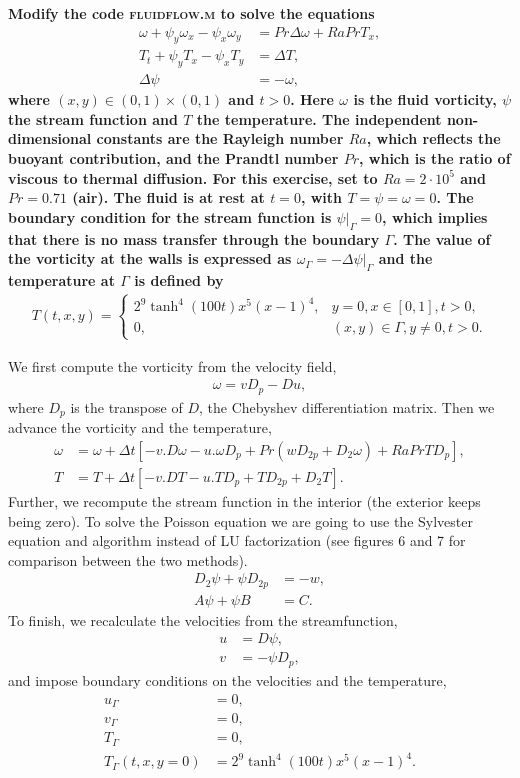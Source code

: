 \textbf{Modify the code \textsc{fluidflow.m} to solve the equations 
\begin{align*}
\omega+\psi_y\omega_x-\psi_x\omega_y &= Pr\Delta\omega+RaPrT_x,\\
T_t+\psi_yT_x-\psi_xT_y &= \Delta T,\\
\Delta\psi &= -\omega,
\end{align*}
where $(x,y)\in (0,1)\times (0,1)$ and $t>0$. Here $\omega$ is the fluid vorticity, $\psi$ the stream function and $T$ the temperature. The independent non-dimensional constants are the Rayleigh number $Ra$, which reflects the buoyant contribution, and the Prandtl number $Pr$, which is the ratio of viscous to thermal diffusion. For this exercise, set to $Ra = 2\cdot 10^5$ and $Pr=0.71$ (air). The fluid is at rest at $t= 0$, with $T=\psi=\omega= 0$. The boundary condition for the stream function is $\left.\psi\right|_{\Gamma}=0$, which implies that there is no mass transfer through the boundary $\Gamma$. The value of the vorticity at the walls is expressed as $\omega_{\Gamma}=-\left.\Delta\psi\right|_{\Gamma}$ and the temperature at $\Gamma$ is defined by
\begin{align*}
T(t,x,y) = 
\begin{cases}
       2^9\tanh^4(100t)x^5(x-1)^4,&  y=0, x\in [0,1], t>0,\\
       0,& (x,y)\in\Gamma, y\neq 0, t>0.
\end{cases}
\end{align*}
}
\newline

We first compute the vorticity from the velocity field,
\begin{align*}
\omega = vD_p-Du,
\end{align*}
where $D_p$ is the transpose of $D$, the Chebyshev differentiation matrix. Then we advance the vorticity and the temperature,
\begin{align*}
\omega &= \omega + \Delta t\left[-v.D\omega-u.\omega D_p+Pr\left(wD_{2p}+D_2\omega\right)+RaPrTD_p\right],\\
T &= T + \Delta t\left[-v.DT-u.TD_p+TD_{2p}+D_2T\right].
\end{align*}
Further, we recompute the stream function in the interior (the exterior keeps being zero). To solve the Poisson equation we are going to use the Sylvester equation and algorithm instead of LU factorization (see figures 6 and 7 for comparison between the two methods).
\begin{align*}
D_2\psi+\psi D_{2p}&=-w,\\
A\psi+\psi B &= C.
\end{align*}
To finish, we recalculate the velocities from the streamfunction,
\begin{align*}
u &= D\psi,\\
v &= -\psi D_{p},
\end{align*}
and impose boundary conditions on the velocities and the temperature,
\begin{align*}
u_{\Gamma}&=0,\\
v_{\Gamma}&=0,\\
T_{\Gamma}&=0,\\
T_{\Gamma}(t,x,y= 0)&=2^9\tanh^4(100t)x^5(x-1)^4.
\end{align*}

